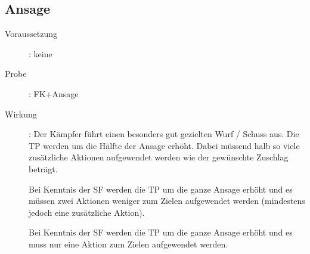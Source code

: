 \subsection{Ansage}
\label{fernkampf.ansage}
\begin{description}
    \item[Voraussetzung]:
        keine
    \item[Probe]:
        FK+Ansage
    \item[Wirkung]:
        Der Kämpfer führt einen besonders gut gezielten Wurf / Schuss aus.
        Die TP werden um die Hälfte der Ansage erhöht.
        Dabei müssend halb so viele zusätzliche Aktionen aufgewendet werden wie der gewünschte Zuschlag beträgt.

        Bei Kenntnis der SF  werden die TP um die ganze Ansage erhöht und es müssen zwei Aktionen weniger zum Zielen aufgewendet werden (mindestens jedoch eine zusätzliche Aktion).

        Bei Kenntnis der SF  werden die TP um die ganze Ansage erhöht und es muss nur eine Aktion zum Zielen aufgewendet werden.
\end{description}
